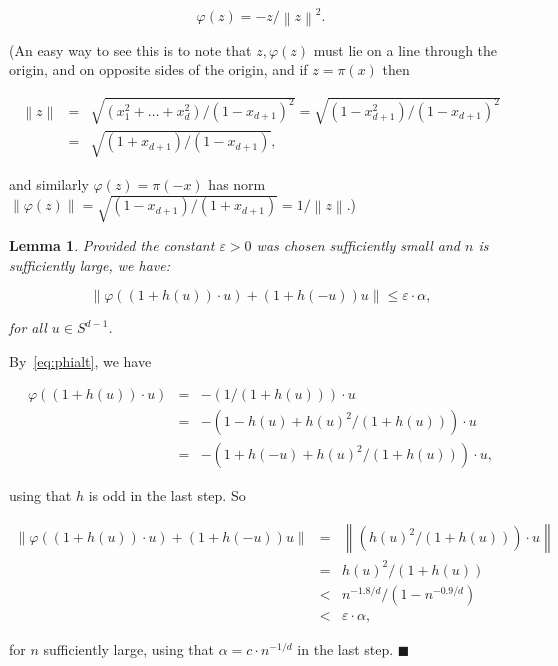 \documentclass[11pt]{article}%
\newenvironment{proof}{\vspace{1ex}\noindent{\bf Proof.}}{\hspace*{\fill}$\blacksquare$\vspace{1ex}}
\newtheorem{lemma}[lemma]{Lemma}
\newcommand{\norm}[1]{\ensuremath{\left\|#1\right\|}}
\newcommand{\eps}{\varepsilon}
\begin{document}
\begin{equation}\label{eq:phialt} \varphi(z) = -z/\norm{z}^2. \end{equation}

\noindent
(An easy way to see this is to note that 
$z, \varphi(z)$  must lie on a line through the origin, and on opposite sides of the origin, and 
if $z = \pi(x)$ then 

$$\begin{array}{rcl} 
\norm{z} 
& = & 
\sqrt{(x_1^2+\dots+x_d^2)/(1-x_{d+1})^2} = \sqrt{(1-x_{d+1}^2)/(1-x_{d+1})^2} \\
& = & 
\sqrt{(1+x_{d+1})/(1-x_{d+1})}, 
\end{array} $$

\noindent
and similarly $\varphi(z) = \pi(-x)$ has norm $\norm{\varphi(z)}=\sqrt{(1-x_{d+1})/(1+x_{d+1})} = 1/\norm{z}$.)


\begin{lemma}\label{lem:phieenplushu}
Provided the constant $\eps>0$ was chosen sufficiently small and $n$ is sufficiently large, we have:

$$ \norm{\varphi( (1+h(u))\cdot u ) + (1+h(-u)) u} \leq \eps\cdot\alpha, $$

\noindent
for all $u \in S^{d-1}$.
\end{lemma}

\begin{proof}
By~\eqref{eq:phialt}, we have 

$$ \begin{array}{rcl} 
\varphi( (1+h(u))\cdot u ) & = & -(1/(1+h(u))) \cdot u \\[2ex]
& = & - \left(1 - h(u) + h(u)^2/(1+h(u))\right) \cdot u \\[2ex]
& = & - \left(1+h(-u)+h(u)^2/(1+h(u))\right) \cdot u,
\end{array} $$

\noindent
using that $h$ is odd in the last step.
So

$$\begin{array}{rcl} 
\norm{\varphi( (1+h(u))\cdot u ) + (1+h(-u)) u} 
& = & 
\norm{(h(u)^2/(1+h(u))) \cdot u} \\[2ex]
& = & 
h(u)^2 / (1+h(u)) \\[2ex]
& < & 
n^{-1.8/d} / (1-n^{-0.9/d}) \\[2ex]
& < & \eps \cdot \alpha,
\end{array} $$

\noindent
for $n$ sufficiently large, using that $\alpha = c \cdot n^{-1/d}$ in the last step.
\end{proof}
\end{document}
